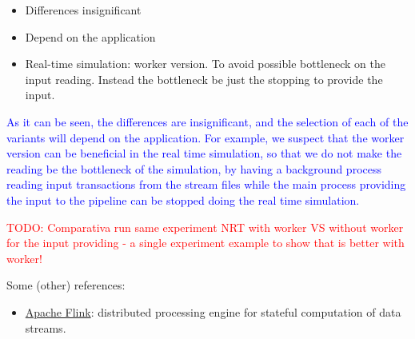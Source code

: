 \begin{itemize}
  \item Differences insignificant
  \item Depend on the application
  \item Real-time simulation: worker version. To avoid possible bottleneck on the input reading. Instead the bottleneck be just the stopping to provide the input.
\end{itemize}

\textcolor{blue}{As it can be seen, the differences are insignificant, and the selection of each of the variants will depend on the application. For example, we suspect that the worker version can be beneficial in the real time simulation, so that we do not make the reading be the bottleneck of the simulation, by having a background process reading input transactions from the stream files while the main process providing the input to the pipeline can be stopped doing the real time simulation.}

\textcolor{red}{TODO: Comparativa run same experiment NRT with worker VS without worker for the input providing - a single experiment example to show that is better with worker!}

Some (other) references:

\begin{itemize}
  \item \href{https://www.confluent.io/es-es/learn/apache-flink/}{Apache Flink}: distributed processing engine for stateful computation of data streams.
\end{itemize}